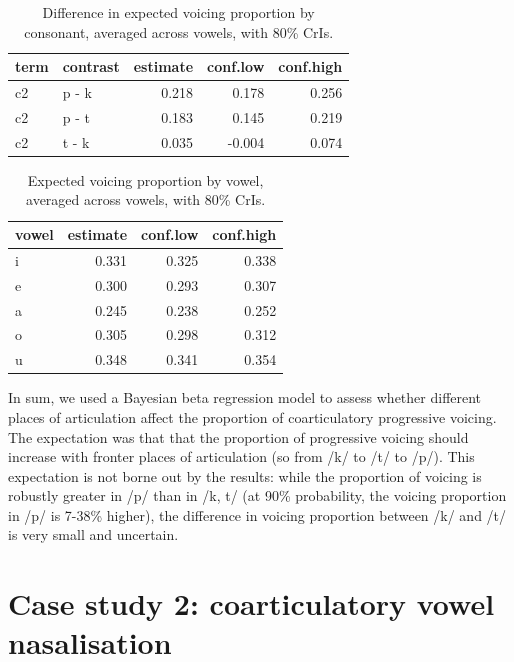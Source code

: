 \documentclass[
  authoryear,
  preprint,
  3p]{elsarticle}
\begin{document}
\begin{longtable}[]{@{}llrrr@{}}

\caption{\label{tbl-marginal-1}Difference in expected voicing proportion
by consonant, averaged across vowels, with 80\% CrIs.}

\tabularnewline

\toprule\noalign{}
term & contrast & estimate & conf.low & conf.high \\
\midrule\noalign{}
\endhead
\bottomrule\noalign{}
\endlastfoot
c2 & p - k & 0.218 & 0.178 & 0.256 \\
c2 & p - t & 0.183 & 0.145 & 0.219 \\
c2 & t - k & 0.035 & -0.004 & 0.074 \\

\end{longtable}

\begin{longtable}[]{@{}lrrr@{}}

\caption{\label{tbl-marginal-2}Expected voicing proportion by vowel,
averaged across vowels, with 80\% CrIs.}

\tabularnewline

\toprule\noalign{}
vowel & estimate & conf.low & conf.high \\
\midrule\noalign{}
\endhead
\bottomrule\noalign{}
\endlastfoot
i & 0.331 & 0.325 & 0.338 \\
e & 0.300 & 0.293 & 0.307 \\
a & 0.245 & 0.238 & 0.252 \\
o & 0.305 & 0.298 & 0.312 \\
u & 0.348 & 0.341 & 0.354 \\

\end{longtable}

\textcolor[HTML]{b22222}{In sum, we used a Bayesian beta regression
model to assess whether different places of articulation affect the
proportion of coarticulatory progressive voicing. The expectation was
that that the proportion of progressive voicing should increase with
fronter places of articulation (so from /k/ to /t/ to /p/). This
expectation is not borne out by the results: while the proportion of
voicing is robustly greater in /p/ than in /k, t/ (at 90\% probability,
the voicing proportion in /p/ is 7-38\% higher), the difference in
voicing proportion between /k/ and /t/ is very small and uncertain.}

\section{Case study 2: coarticulatory vowel
nasalisation}\label{sec-case-2}
\end{document}

